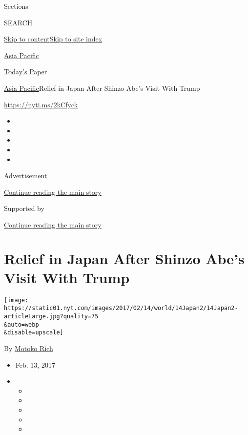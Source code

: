 Sections

SEARCH

\protect\hyperlink{site-content}{Skip to
content}\protect\hyperlink{site-index}{Skip to site index}

\href{https://www.nytimes.com/section/world/asia}{Asia Pacific}

\href{https://myaccount.nytimes.com/auth/login?response_type=cookie\&client_id=vi}{}

\href{https://www.nytimes.com/section/todayspaper}{Today's Paper}

\href{/section/world/asia}{Asia Pacific}\textbar{}Relief in Japan After
Shinzo Abe's Visit With Trump

\url{https://nyti.ms/2kCfyck}

\begin{itemize}
\item
\item
\item
\item
\item
\end{itemize}

Advertisement

\protect\hyperlink{after-top}{Continue reading the main story}

Supported by

\protect\hyperlink{after-sponsor}{Continue reading the main story}

\hypertarget{relief-in-japan-after-shinzo-abes-visit-with-trump}{%
\section{Relief in Japan After Shinzo Abe's Visit With
Trump}\label{relief-in-japan-after-shinzo-abes-visit-with-trump}}

\texttt{[image: https://static01.nyt.com/images/2017/02/14/world/14Japan2/14Japan2-articleLarge.jpg?quality=75\\\&auto=webp\\\&disable=upscale]}

By \href{http://www.nytimes.com/by/motoko-rich}{Motoko Rich}

\begin{itemize}
\item
  Feb. 13, 2017
\item
  \begin{itemize}
  \item
  \item
  \item
  \item
  \item
  \end{itemize}
\end{itemize}

